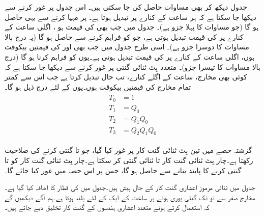  جدول  دیکھ کر بھی مساوات  حاصل کی جا سکتی ہیں۔ اس جدول پر غور کرنے سے دیکھا جا سکتا ہے کہ  ہر ساعت کے کنارے پر تبدیل ہوتا ہے۔  پر  مہیا کرنے سے یہی حاصل ہو گا (جو مساوات  کا پہلا جزو ہے)۔ جدول میں جب بھی  کی قیمت  ہو ، اگلی ساعت کے کنارے پر  کی قیمت تبدیل ہوتی ہے، جو  کو  فراہم کرنے سے حاصل ہو گا (یہ درج بالا مساوات کا دوسرا جزو ہے)۔ اسی طرح جدول میں جب بھی  اور  کی قیمتیں بیکوقت  ہوں، اگلی ساعت کے کنارے پر  کی قیمت تبدیل ہوتی ہے۔یوں  کو  فراہم کرنا ہو گا (درج بالا مساوات کا تیسرا جزو)۔ متعدد بِٹ ثنائی گنتی پر غور کرنے سے دیکھا جا سکتا ہے کہ کوئی بھی مخارج، ساعت کے اگلے کنارے، تب حال تبدیل کرتا ہے جب اس سے کمتر تمام مخارج کی قیمتیں بیکوقت  ہوں۔یوں  کے لئے درج ذیل ہو گا۔
\begin{gather}
\begin{aligned}\label{مساوات_گنت_کار_چار_بِٹ}
T_0&=1\\
T_1&=Q_0\\
T_2&=Q_1Q_0\\
T_3&=Q_2Q_1Q_0
\end{aligned}
\end{gather}

گزشتہ حصے میں تین بِٹ ثنائی گنت کار پر غور کیا گیا، جو  تا  گنتی کرنے کی صلاحیت رکھتا ہے۔چار بِٹ ثنائی گنت کار  تا  ثنائی گنتی کر سکتا ہے۔چار بِٹ ثنائی گنت کار  کو  تا  گنتی کرنے کا پابند بنانے سے  حاصل ہو گا، جس پر اس حصہ میں غور کیا جائے گا۔

جدول  میں ثنائی  مرموز  اعشاری گنت کار کے حال پیش ہیں۔جدول میں   کی قطار کا اضافہ کیا گیا ہے۔مخارج  صفر سے نو تک گنتی پوری ہونے پر ساعت کے ایک کے لئے بلند ہوتا ہے۔ہم آگے دیکھیں گے کہ  استعمال کرتے ہوئے متعدد اعشاری ہندسوں کے گنت کار تخلیق دیے جاتے ہیں۔

